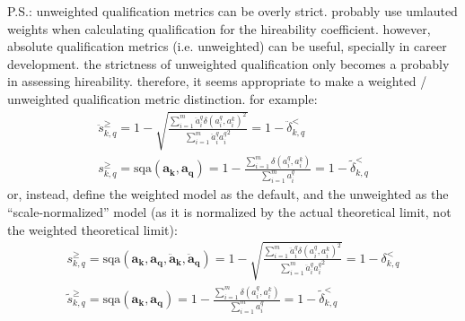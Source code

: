\documentclass{elsarticle} %
\begin{document}
P.S.: unweighted qualification metrics can be overly strict. probably use umlauted weights when calculating qualification for the hireability coefficient. however, absolute qualification metrics (i.e. unweighted) can be useful, specially in career development. the strictness of unweighted qualification only becomes a probably in assessing hireability. therefore, it seems appropriate to make a weighted / unweighted qualification metric distinction. for example:
\begin{gather}
    \ddot{s}_{k,q}^{\geq} =
    1 - 
    \sqrt{
    \frac{
    \sum_{i=1}^{m}{
    \ddot{a}_{i}^{q} {\delta(a_{i}^{q}, a_{i}^{k})} ^ 2
    }
    }{
    \sum_{i=1}^{m}{
    \ddot{a}_{i}^{q} {a_{i}^{q}} ^ 2
    }
    }
    } = 
    1 - \ddot{\delta}_{k,q}^{<}
    \\
    s_{k,q}^{\geq} =
    \text{sqa}(\boldsymbol{a_k}, \boldsymbol{a_q}) =
    1 -
    \frac{
    \sum_{i=1}^{m}{
    {\delta(a_{i}^{q}, a_{i}^{k})}
    }
    }{
    \sum_{i=1}^{m}{
    a_{i}^{q}
    }
    } =
    1 - \tilde{\delta}_{k,q}^{<}
\end{gather}
or, instead, define the weighted model as the default, and the unweighted as the ``scale-normalized'' model (as it is normalized by the actual theoretical limit, not the weighted theoretical limit):
\begin{gather}
    s_{k,q}^{\geq} =
    \text{sqa}(\boldsymbol{a_k}, \boldsymbol{a_q}, \boldsymbol{\ddot{a}_k}, \boldsymbol{\ddot{a}_q}) =
    1 - 
    \sqrt{
    \frac{
    \sum_{i=1}^{m}{
    \ddot{a}_{i}^{q} {\delta(a_{i}^{q}, a_{i}^{k})} ^ 2
    }
    }{
    \sum_{i=1}^{m}{
    \ddot{a}_{i}^{q} {a_{i}^{q}} ^ 2
    }
    }
    } = 
    1 - \delta_{k,q}^{<}
    \\
    \tilde{s}_{k,q}^{\geq} =
    \text{sqa}(\boldsymbol{a_k}, \boldsymbol{a_q}) =
    1 -
    \frac{
    \sum_{i=1}^{m}{
    {\delta(a_{i}^{q}, a_{i}^{k})}
    }
    }{
    \sum_{i=1}^{m}{
    a_{i}^{q}
    }
    } =
    1 - \tilde{\delta}_{k,q}^{<}
\end{gather}
\end{document}
